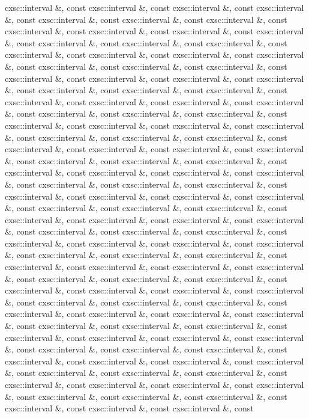 \begin{DoxyCompactItemize}
cxsc\-::interval \&, const cxsc\-::interval \&, const cxsc\-::interval \&, const cxsc\-::interval \&, const cxsc\-::interval \&, const cxsc\-::interval \&, const cxsc\-::interval \&, const cxsc\-::interval \&, const cxsc\-::interval \&, const cxsc\-::interval \&, const cxsc\-::interval \&, const cxsc\-::interval \&, const cxsc\-::interval \&, const cxsc\-::interval \&, const cxsc\-::interval \&, const cxsc\-::interval \&, const cxsc\-::interval \&, const cxsc\-::interval \&, const cxsc\-::interval \&, const cxsc\-::interval \&, const cxsc\-::interval \&, const cxsc\-::interval \&, const cxsc\-::interval \&, const cxsc\-::interval \&, const cxsc\-::interval \&, const cxsc\-::interval \&, const cxsc\-::interval \&, const cxsc\-::interval \&, const cxsc\-::interval \&, const cxsc\-::interval \&, const cxsc\-::interval \&, const cxsc\-::interval \&, const cxsc\-::interval \&, const cxsc\-::interval \&, const cxsc\-::interval \&, const cxsc\-::interval \&, const cxsc\-::interval \&, const cxsc\-::interval \&, const cxsc\-::interval \&, const cxsc\-::interval \&, const cxsc\-::interval \&, const cxsc\-::interval \&, const cxsc\-::interval \&, const cxsc\-::interval \&, const cxsc\-::interval \&, const cxsc\-::interval \&, const cxsc\-::interval \&, const cxsc\-::interval \&, const cxsc\-::interval \&, const cxsc\-::interval \&, const cxsc\-::interval \&, const cxsc\-::interval \&, const cxsc\-::interval \&, const cxsc\-::interval \&, const cxsc\-::interval \&, const cxsc\-::interval \&, const cxsc\-::interval \&, const cxsc\-::interval \&, const cxsc\-::interval \&, const cxsc\-::interval \&, const cxsc\-::interval \&, const cxsc\-::interval \&, const cxsc\-::interval \&, const cxsc\-::interval \&, const cxsc\-::interval \&, const cxsc\-::interval \&, const cxsc\-::interval \&, const cxsc\-::interval \&, const cxsc\-::interval \&, const cxsc\-::interval \&, const cxsc\-::interval \&, const cxsc\-::interval \&, const cxsc\-::interval \&, const cxsc\-::interval \&, const cxsc\-::interval \&, const cxsc\-::interval \&, const cxsc\-::interval \&, const cxsc\-::interval \&, const cxsc\-::interval \&, const cxsc\-::interval \&, const cxsc\-::interval \&, const cxsc\-::interval \&, const cxsc\-::interval \&, const cxsc\-::interval \&, const cxsc\-::interval \&, const cxsc\-::interval \&, const cxsc\-::interval \&, const cxsc\-::interval \&, const cxsc\-::interval \&, const cxsc\-::interval \&, const cxsc\-::interval \&, const cxsc\-::interval \&, const cxsc\-::interval \&, const cxsc\-::interval \&, const cxsc\-::interval \&, const cxsc\-::interval \&, const cxsc\-::interval \&, const cxsc\-::interval \&, const cxsc\-::interval \&, const cxsc\-::interval \&, const cxsc\-::interval \&, const cxsc\-::interval \&, const cxsc\-::interval \&, const cxsc\-::interval \&, const cxsc\-::interval \&, const cxsc\-::interval \&, const cxsc\-::interval \&, const cxsc\-::interval \&, const cxsc\-::interval \&, const cxsc\-::interval \&, const cxsc\-::interval \&, const cxsc\-::interval \&, const cxsc\-::interval \&, const cxsc\-::interval \&, const cxsc\-::interval \&, const cxsc\-::interval \&, const cxsc\-::interval \&, const cxsc\-::interval \&, const cxsc\-::interval \&, const cxsc\-::interval \&, const cxsc\-::interval \&, const cxsc\-::interval \&, const 
\end{DoxyCompactItemize}
